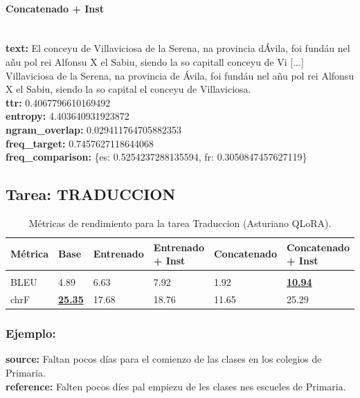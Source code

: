 \paragraph{Concatenado + Inst}~\\
\textbf{text:} El conceyu de Villaviciosa de la Serena, na provincia d\textquotesingle{}Ávila, foi fundáu nel añu pol rei Alfonsu X el Sabiu, siendo la so capital\textquotesingle{}l conceyu de Vi [...]  Villaviciosa de la Serena, na provincia de Ávila, foi fundáu nel añu pol rei Alfonsu X el Sabiu, siendo la so capital el conceyu de Villaviciosa.\\
\textbf{ttr:} 0.4067796610169492\\
\textbf{entropy:} 4.403640931923872\\
\textbf{ngram\_overlap:} 0.029411764705882353\\
\textbf{freq\_target:} 0.7457627118644068\\
\textbf{freq\_comparison:} \{\textquotesingle{}es\textquotesingle{}: 0.5254237288135594, \textquotesingle{}fr\textquotesingle{}: 0.3050847457627119\}\\

\subsection{Tarea: TRADUCCION}\label{tarea-traduccion}
\begin{longtable}[]{@{}llllll@{}}
\toprule\noalign{}
Métrica & Base & Entrenado & Entrenado + Inst & Concatenado & Concatenado + Inst \\
\midrule\noalign{}
\endhead
\bottomrule\noalign{}
\caption{Métricas de rendimiento para la tarea Traduccion (Asturiano QLoRA).}
\label{tab:metricas_traduccion_Asturiano QLoRA}}\\
\endlastfoot
BLEU & 4.89 & 6.63 & 7.92 & 1.92 & \textbf{\underline{10.94}} \\
chrF & \textbf{\underline{25.35}} & 17.68 & 18.76 & 11.65 & 25.29 \\
\end{longtable}

\subsubsection{Ejemplo:}
\textbf{source:} Faltan pocos días para el comienzo de las clases en los colegios de Primaria.\\
\textbf{reference:} Falten pocos díes pal empiezu de les clases nes escueles de Primaria.\\

